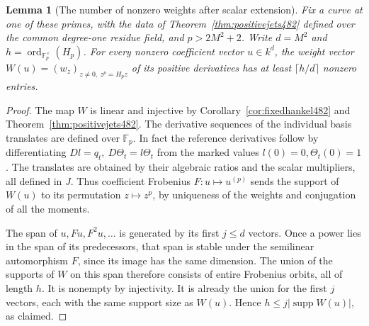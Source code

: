\documentclass[a4paper,11pt]{article}
\newtheorem{lemma}[proposition]{Lemma}
\theoremstyle{definition}
\theoremstyle{remark}
\numberwithin{equation}{section}
\begin{document}
\begin{lemma}[The number of nonzero weights after scalar extension]\leavevmode
\label{lem:supportorbit483}
Fix a curve at one of these primes, with the data of
Theorem~\ref{thm:positivejets482} defined over the common
degree-one residue field, and \(p>2M^2+2\). Write \(d=M^2\)
and \(h=\operatorname{ord}_{\mathbb F_p^\times}(H_p)\).
For \emph{every} nonzero coefficient vector \(u\in k^d\),
the weight vector \(W(u)=(w_z)_{z\ne0,\ z^p=H_pz}\) of its
positive derivatives has at least \(\lceil h/d\rceil\)
nonzero entries.
\end{lemma}
\begin{proof}
The map \(W\) is linear and injective by
Corollary~\ref{cor:fixedhankel482} and
Theorem~\ref{thm:positivejets482}. The derivative sequences
of the individual basis translates are defined over
\(\mathbb F_p\). In fact the reference derivatives follow by
differentiating \(Dl=q_t,\ D\Theta_t=l\Theta_t\) from the
marked values \(l(0)=0,\Theta_t(0)=1\). The translates are
obtained by their algebraic ratios and the scalar multipliers,
all defined in \(J\). Thus coefficient Frobenius \(F:u\mapsto
u^{(p)}\) sends the support of \(W(u)\) to its permutation
\(z\mapsto z^p\), by uniqueness of the weights and conjugation
of all the moments.

The span of \(u,Fu,F^2u,\ldots\) is generated by its first
\(j\le d\) vectors. Once a power lies in the span of its
predecessors, that span is stable under the semilinear
automorphism \(F\), since its image has the same dimension.
The union of the supports of \(W\) on this span therefore
consists of entire Frobenius orbits, all of length \(h\).
It is nonempty by injectivity. It is already the union for the
first \(j\) vectors, each with the same support size as \(W(u)\).
Hence \(h\le j|\operatorname{supp}W(u)|\), as claimed.
\end{proof}
\end{document}
